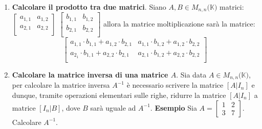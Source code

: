 \documentclass[12pt,a4paper,oneside]{book}
\begin{document}
\begin{enumerate}

\item \textbf{Calcolare il prodotto tra due matrici}. \linebreak
	  Siano $A,B \in M_{n,n}(\mathbb{K)}$ matrici: \hfill \break
	  $\begin{bmatrix}a_{1,1} & a_{1, 2} \\a_{2,1} & a_{2, 2} \\\end{bmatrix}$ \hspace{2cm}
	  $\begin{bmatrix}b_{1,1} & b_{1, 2} \\b_{2,1} & b_{2, 2} \\\end{bmatrix}$ \hfill \break
	 allora la matrice moltiplicazione sarà la matrice:
	 $$\begin{bmatrix}a_{1,1}\cdot b_{1, 1} + a_{1, 2}\cdot b_{2, 1} & a_{1, 1}\cdot b_{1, 2} + a_{1, 2}
	 \cdot b_{2, 2}\\a_{2_1}\cdot b_{1, 1} + a_{2, 2}\cdot b_{2, 1} & a_{2, 1}\cdot b_{1, 2}+a_{2, 2}
	 \cdot b_{2, 2} \\\end{bmatrix}$$
	
\item \textbf{Calcolare la matrice inversa di una matrice $A$}. \linebreak
	  Sia data $A \in M_{n,n}(\mathbb{K)}$, per calcolare la matrice inversa $A^{-1}$ è necessario scrivere
	  la matrice $[A|I_n]$ e dunque, tramite operazioni elementari sulle righe, ridurre la matrice $[A|I_n]
	  $ a matrice $[I_n|B]$, dove $B$ sarà uguale ad $A^{-1}$. \hfill \break
	  \linebreak
	  \textbf{Esempio} \linebreak
	  Sia $A=\begin{bmatrix}1 & 2 \\ 3& 7   \end{bmatrix}$. Calcolare $A^{-1}$. \hfill \break
	

\end{enumerate}
\end{document}
